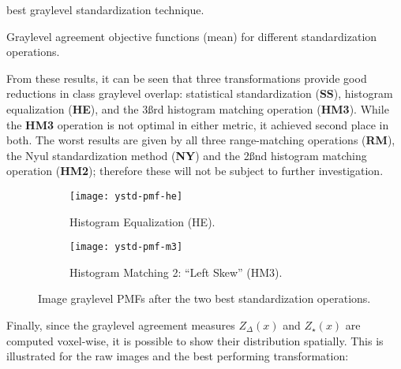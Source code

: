 best graylevel standardization technique.
\par
\begin{table}
  \centering
  \caption{Graylevel agreement objective functions (mean) for different standardization operations.}%
  \label{tab:ystd-exp}
  
\end{table}
From these results, it can be seen that three transformations provide
good reductions in class graylevel overlap:
statistical standardization (\textbf{SS}),
histogram equalization (\textbf{HE}),
and the 3\ss{rd} histogram matching operation (\textbf{HM3}).
While the \textbf{HM3} operation is not optimal in either metric,
it achieved second place in both.
The worst results are given by
all three range-matching operations (\textbf{RM}),
the Nyul standardization method (\textbf{NY})
and the 2\ss{nd} histogram matching operation (\textbf{HM2});
therefore these will not be subject to further investigation.
\begin{figure}
  \centering
  \begin{subfigure}{\plotwidth}
    \texttt{[image: ystd-pmf-he]}
    \caption{Histogram Equalization (HE).}%
    \label{fig:ystd-pmf-he}
  \end{subfigure}
  \begin{subfigure}{\plotwidth}
    \texttt{[image: ystd-pmf-m3]}
    \caption{Histogram Matching 2: ``Left Skew'' (HM3).}%
    \label{fig:ystd-pmf-hm2}
  \end{subfigure}
  \caption{Image graylevel PMFs after the two best standardization operations.}%
  \label{fig:ystd-pmf-best}
\end{figure}
Finally, since the graylevel agreement measures $Z_{\Delta}(x)$ and $Z_{\star}(x)$
are computed voxel-wise, it is possible to show their distribution spatially.
This is illustrated for the raw images and the best performing transformation:
